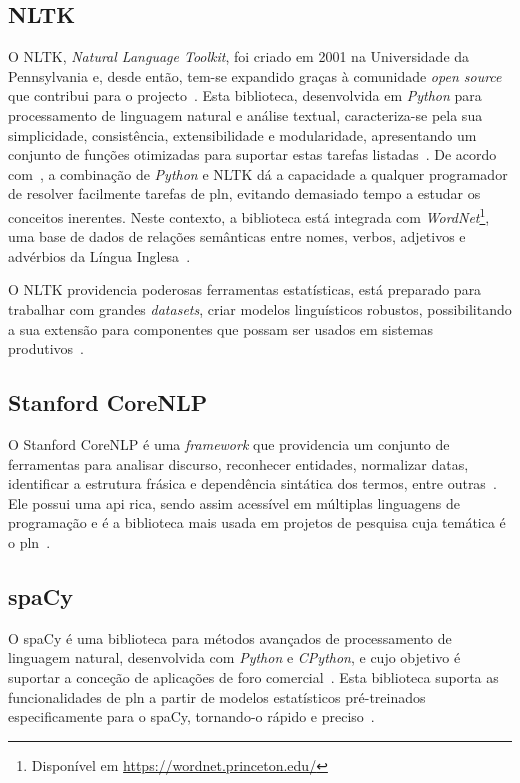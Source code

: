 \subsection{NLTK}
O NLTK, \textit{Natural Language Toolkit}, foi criado em 2001 na Universidade da Pennsylvania e, desde então, tem-se expandido graças à comunidade \textit{open source} que contribui para o projecto~\parencite{applied_natural_language_processing_with_python}. Esta biblioteca, desenvolvida em \textit{Python} para processamento de linguagem natural e análise textual, caracteriza-se pela sua simplicidade, consistência, extensibilidade e modularidade, apresentando um conjunto de funções otimizadas para suportar estas tarefas listadas~\parencite{applied_natural_language_processing_with_python, python_text_processing_nltk_cookbook}. De acordo com~\textcite{nltk_education_scientific_purposes}, a combinação de \textit{Python} e NLTK dá a capacidade a qualquer programador de resolver facilmente tarefas de \gls{pln}, evitando demasiado tempo a  estudar os conceitos inerentes. Neste contexto, a biblioteca está integrada com \textit{WordNet}\footnote{Disponível em \url{https://wordnet.princeton.edu/}}, uma base de dados de relações semânticas entre nomes, verbos, adjetivos e advérbios da Língua Inglesa~\parencite{nltk_education_scientific_purposes}.

O NLTK providencia poderosas ferramentas estatísticas, está preparado para trabalhar com grandes \textit{datasets}, criar modelos linguísticos robustos, possibilitando a sua extensão para componentes que possam ser usados em sistemas produtivos~\parencite{nltk_education_scientific_purposes, applied_natural_language_processing_with_python}.

\subsection{Stanford CoreNLP}
O Stanford CoreNLP é uma \textit{framework} que providencia um conjunto de ferramentas para analisar discurso, reconhecer entidades, normalizar datas, identificar a estrutura frásica e dependência sintática dos termos, entre outras~\parencite{stanford_open_nlp}. Ele possui uma \gls{api} rica, sendo assim acessível em múltiplas linguagens de programação e é a biblioteca mais usada em projetos de pesquisa cuja temática é o \gls{pln}~\parencite{stanford_open_nlp, choosing_nlp_library}.

\subsection{spaCy}
O spaCy é uma biblioteca para métodos avançados de processamento de linguagem natural, desenvolvida com \textit{Python} e \textit{CPython}, e cujo objetivo é suportar a conceção de aplicações de foro comercial~\parencite{choosing_nlp_library}. Esta biblioteca suporta as funcionalidades de \gls{pln} a partir de modelos estatísticos pré-treinados especificamente para o spaCy, tornando-o rápido e preciso~\parencite{spacy_usage}.

